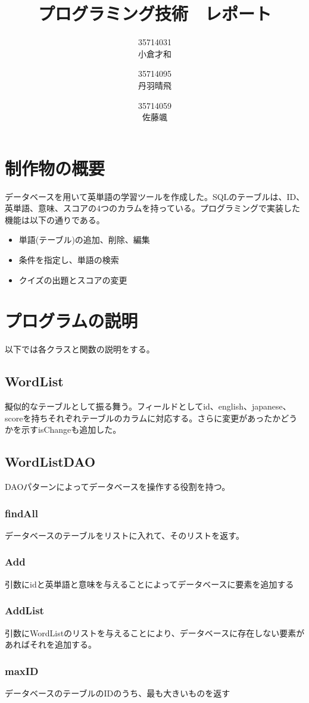 \documentclass{ltjsarticle}
\title{プログラミング技術　レポート}
\author{35714031 \\ 小倉才和 \and 35714095 \\ 丹羽晴飛 \and 35714059 \\ 佐藤颯}
\date{\empty}
\begin{document}
\maketitle
\section{制作物の概要}
データベースを用いて英単語の学習ツールを作成した。SQLのテーブルは、ID、英単語、意味、スコアの4つのカラムを持っている。プログラミングで実装した機能は以下の通りである。
\begin{itemize}
    \item 単語(テーブル)の追加、削除、編集
    \item 条件を指定し、単語の検索
    \item クイズの出題とスコアの変更
\end{itemize}

\section{プログラムの説明}
以下では各クラスと関数の説明をする。
\subsection{WordList}
擬似的なテーブルとして振る舞う。フィールドとしてid、english、japanese、scoreを持ちそれぞれテーブルのカラムに対応する。さらに変更があったかどうかを示すisChangeも追加した。
\subsection{WordListDAO}
DAOパターンによってデータベースを操作する役割を持つ。
\subsubsection{findAll}
データベースのテーブルをリストに入れて、そのリストを返す。
\subsubsection{Add}
引数にidと英単語と意味を与えることによってデータベースに要素を追加する
\subsubsection{AddList}
引数にWordListのリストを与えることにより、データベースに存在しない要素があればそれを追加する。
\subsubsection{maxID}
データベースのテーブルのIDのうち、最も大きいものを返す
\end{document}
